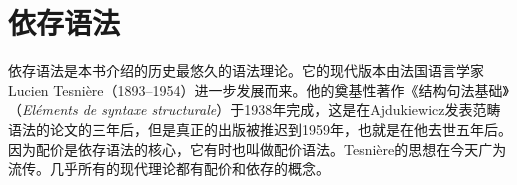 \chapter{依存语法}
\label{Kapitel-DG}

依存语法是本书介绍的历史最悠久的语法理论。它的现代版本由法国语言学家Lucien Tesnière（1893--1954）进一步发展而来。他的奠基性著作《结构句法基础》（\emph{Eléments de syntaxe structurale}）于1938年完成，这是在Ajdukiewicz发表范畴语法的论文的三年后\citeyearpar{Ajdukiewicz35a-u}，但是真正的出版被推迟到1959年，也就是在他去世五年后\nocite{Tesniere59a-u}。因为配价是依存语法的核心，它有时也叫做配价语法。Tesnière的思想在今天广为流传。几乎所有的现代理论都有配价和依存的概念\citep[--263, 284]{AF2010a}。

